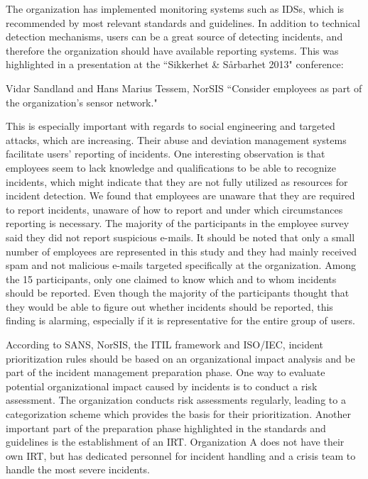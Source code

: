 The organization has implemented monitoring systems such as IDSs, which is recommended by most relevant standards and guidelines. In addition to technical detection mechanisms, users can be a great source of detecting incidents, and therefore the organization should have available reporting systems. This was highlighted in a presentation at the ``Sikkerhet \& S\aa rbarhet 2013" conference:

\begin{newquote}{Vidar Sandland and Hans Marius Tessem, NorSIS}
``Consider employees as part of the organization's sensor network."
\end{newquote}

This is especially important with regards to social engineering and targeted attacks, which are increasing. Their abuse and deviation management systems facilitate users' reporting of incidents. One interesting observation is that employees seem to lack knowledge and qualifications to be able to recognize incidents, which might indicate that they are not fully utilized as resources for incident detection. We found that employees are unaware that they are required to report incidents, unaware of how to report and under which circumstances reporting is necessary. The majority of the participants in the employee survey said they did not report suspicious e-mails. It should be noted that only a small number of employees are represented in this study and they had mainly received spam and not malicious e-mails targeted specifically at the organization. Among the 15 participants, only one claimed to know which and to whom incidents should be reported. Even though the majority of the participants thought that they would be able to figure out whether incidents should be reported, this finding is alarming, especially if it is representative for the entire group of users. 

According to SANS, NorSIS, the ITIL framework and ISO/IEC, incident prioritization rules should be based on an organizational impact analysis and be part of the incident management preparation phase. One way to evaluate potential organizational impact caused by incidents is to conduct a risk assessment. The organization conducts risk assessments regularly, leading to a categorization scheme which provides the basis for their prioritization. Another important part of the preparation phase highlighted in the standards and guidelines is the establishment of an \ac{IRT}. Organization A does not have their own \ac{IRT}, but has dedicated personnel for incident handling and a crisis team to handle the most severe incidents.

